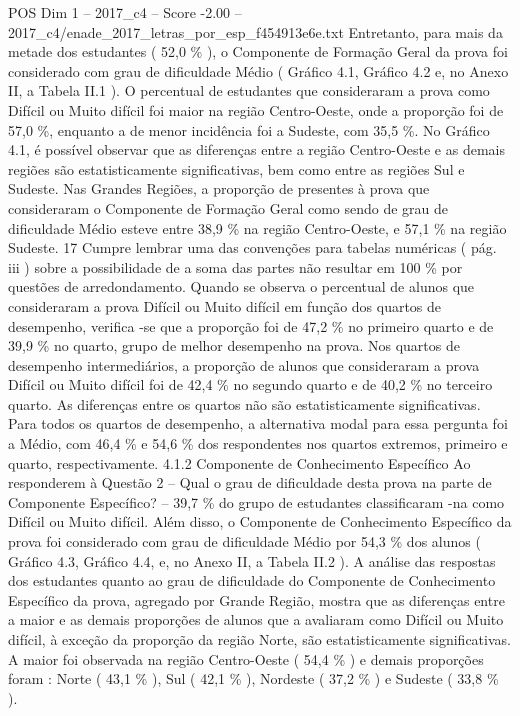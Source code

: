 \begin{textsample}{POS Dim 1 – 2017\_c4 – Score -2.00 – 2017\_c4/enade\_2017\_letras\_por\_esp\_f454913e6e.txt}
Entretanto, para mais da metade dos estudantes ( 52,0 \% ), o Componente de Formação Geral da prova foi considerado com grau de dificuldade Médio ( Gráfico 4.1, Gráfico 4.2 e, no Anexo II, a Tabela II.1 ).
O percentual de estudantes que consideraram a prova como Difícil ou Muito difícil foi maior na região Centro-Oeste, onde a proporção foi de 57,0 \%, enquanto a de menor incidência foi a Sudeste, com 35,5 \%.
No Gráfico 4.1, é possível observar que as diferenças entre a região Centro-Oeste e as demais regiões são estatisticamente significativas, bem como entre as regiões Sul e Sudeste.
Nas Grandes Regiões, a proporção de presentes à prova que consideraram o Componente de Formação Geral como sendo de grau de dificuldade Médio esteve entre 38,9 \% na região Centro-Oeste, e 57,1 \% na região Sudeste. 17 Cumpre lembrar uma das convenções para tabelas numéricas ( pág. iii ) sobre a possibilidade de a soma das partes não resultar em 100 \% por questões de arredondamento.
Quando se observa o percentual de alunos que consideraram a prova Difícil ou Muito difícil em função dos quartos de desempenho, verifica -se que a proporção foi de 47,2 \% no primeiro quarto e de 39,9 \% no quarto, grupo de melhor desempenho na prova.
Nos quartos de desempenho intermediários, a proporção de alunos que consideraram a prova Difícil ou Muito difícil foi de 42,4 \% no segundo quarto e de 40,2 \% no terceiro quarto.
As diferenças entre os quartos não são estatisticamente significativas.
Para todos os quartos de desempenho, a alternativa modal para essa pergunta foi a Médio, com 46,4 \% e 54,6 \% dos respondentes nos quartos extremos, primeiro e quarto, respectivamente. 4.1.2 Componente de Conhecimento Específico Ao responderem à Questão 2 – Qual o grau de dificuldade desta prova na parte de Componente Específico? – 39,7 \% do grupo de estudantes classificaram -na como Difícil ou Muito difícil.
Além disso, o Componente de Conhecimento Específico da prova foi considerado com grau de dificuldade Médio por 54,3 \% dos alunos ( Gráfico 4.3, Gráfico 4.4, e, no Anexo II, a Tabela II.2 ).
A análise das respostas dos estudantes quanto ao grau de dificuldade do Componente de Conhecimento Específico da prova, agregado por Grande Região, mostra que as diferenças entre a maior e as demais proporções de alunos que a avaliaram como Difícil ou Muito difícil, à exceção da proporção da região Norte, são estatisticamente significativas.
A maior foi observada na região Centro-Oeste ( 54,4 \% ) e demais proporções foram : Norte ( 43,1 \% ), Sul ( 42,1 \% ), Nordeste ( 37,2 \% ) e Sudeste ( 33,8 \% ).

\end{textsample}
